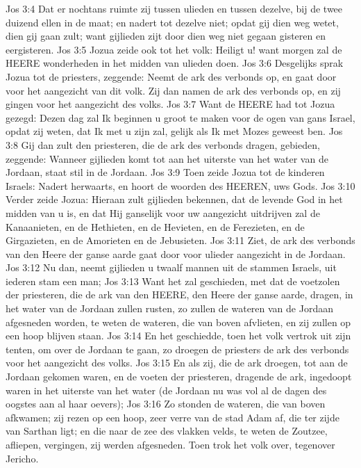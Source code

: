 Jos 3:4  Dat er nochtans ruimte zij tussen ulieden en tussen dezelve, bij de twee duizend ellen in de maat; en nadert tot dezelve niet; opdat gij dien weg wetet, dien gij gaan zult; want gijlieden zijt door dien weg niet gegaan gisteren en eergisteren.
Jos 3:5  Jozua zeide ook tot het volk: Heiligt u! want morgen zal de HEERE wonderheden in het midden van ulieden doen.
Jos 3:6  Desgelijks sprak Jozua tot de priesters, zeggende: Neemt de ark des verbonds op, en gaat door voor het aangezicht van dit volk. Zij dan namen de ark des verbonds op, en zij gingen voor het aangezicht des volks.
Jos 3:7  Want de HEERE had tot Jozua gezegd: Dezen dag zal Ik beginnen u groot te maken voor de ogen van gans Israel, opdat zij weten, dat Ik met u zijn zal, gelijk als Ik met Mozes geweest ben.
Jos 3:8  Gij dan zult den priesteren, die de ark des verbonds dragen, gebieden, zeggende: Wanneer gijlieden komt tot aan het uiterste van het water van de Jordaan, staat stil in de Jordaan.
Jos 3:9  Toen zeide Jozua tot de kinderen Israels: Nadert herwaarts, en hoort de woorden des HEEREN, uws Gods.
Jos 3:10  Verder zeide Jozua: Hieraan zult gijlieden bekennen, dat de levende God in het midden van u is, en dat Hij ganselijk voor uw aangezicht uitdrijven zal de Kanaanieten, en de Hethieten, en de Hevieten, en de Ferezieten, en de Girgazieten, en de Amorieten en de Jebusieten.
Jos 3:11  Ziet, de ark des verbonds van den Heere der ganse aarde gaat door voor ulieder aangezicht in de Jordaan.
Jos 3:12  Nu dan, neemt gijlieden u twaalf mannen uit de stammen Israels, uit iederen stam een man;
Jos 3:13  Want het zal geschieden, met dat de voetzolen der priesteren, die de ark van den HEERE, den Heere der ganse aarde, dragen, in het water van de Jordaan zullen rusten, zo zullen de wateren van de Jordaan afgesneden worden, te weten de wateren, die van boven afvlieten, en zij zullen op een hoop blijven staan.
Jos 3:14  En het geschiedde, toen het volk vertrok uit zijn tenten, om over de Jordaan te gaan, zo droegen de priesters de ark des verbonds voor het aangezicht des volks.
Jos 3:15  En als zij, die de ark droegen, tot aan de Jordaan gekomen waren, en de voeten der priesteren, dragende de ark, ingedoopt waren in het uiterste van het water (de Jordaan nu was vol al de dagen des oogstes aan al haar oevers);
Jos 3:16  Zo stonden de wateren, die van boven afkwamen; zij rezen op een hoop, zeer verre van de stad Adam af, die ter zijde van Sarthan ligt; en die naar de zee des vlakken velds, te weten de Zoutzee, afliepen, vergingen, zij werden afgesneden. Toen trok het volk over, tegenover Jericho.
